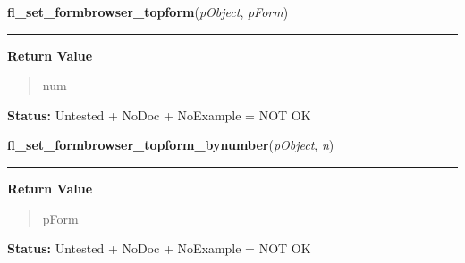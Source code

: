     \label{xformslib:library:fl_set_formbrowser_topform}

    \vspace{0.5ex}

\hspace{.8\funcindent}\begin{boxedminipage}{\funcwidth}

    \raggedright \textbf{fl\_set\_formbrowser\_topform}(\textit{pObject}, \textit{pForm})

    \vspace{-1.5ex}

    \rule{\textwidth}{0.5\fboxrule}
\setlength{\parskip}{2ex}
\setlength{\parskip}{1ex}
      \textbf{Return Value}
    \vspace{-1ex}

      \begin{quote}
      num

      \end{quote}

\textbf{Status:} Untested + NoDoc + NoExample = NOT OK



    \end{boxedminipage}

    \label{xformslib:library:fl_set_formbrowser_topform_bynumber}

    \vspace{0.5ex}

\hspace{.8\funcindent}\begin{boxedminipage}{\funcwidth}

    \raggedright \textbf{fl\_set\_formbrowser\_topform\_bynumber}(\textit{pObject}, \textit{n})

    \vspace{-1.5ex}

    \rule{\textwidth}{0.5\fboxrule}
\setlength{\parskip}{2ex}
\setlength{\parskip}{1ex}
      \textbf{Return Value}
    \vspace{-1ex}

      \begin{quote}
      pForm

      \end{quote}

\textbf{Status:} Untested + NoDoc + NoExample = NOT OK



    \end{boxedminipage}

